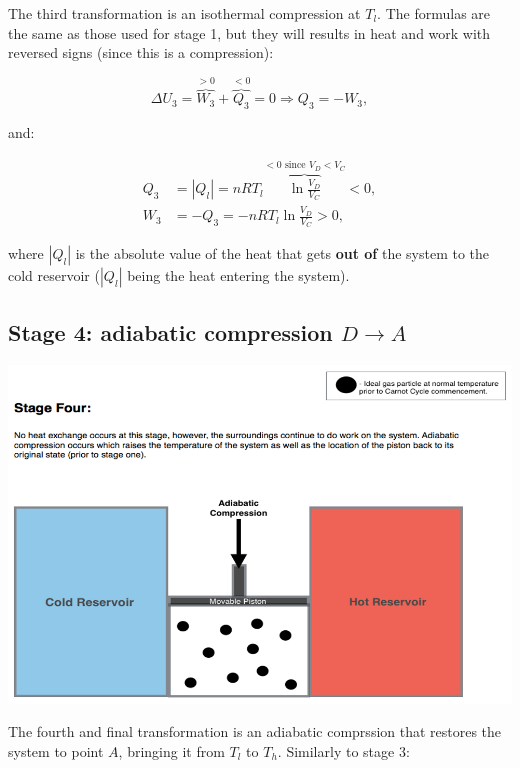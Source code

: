 \documentclass[
  9pt,
]{extbook}
\theoremstyle{definition}
\theoremstyle{definition}
\theoremstyle{definition}
\theoremstyle{definition}
\theoremstyle{remark}
\begin{document}
The third transformation is an isothermal compression at \(T_l\). The formulas are the same as those used for stage 1, but they will results in heat and work with reversed signs (since this is a compression):

\begin{equation}
\Delta U_3 = \overbrace{W_3}^{>0} + \overbrace{Q_3}^{<0} = 0 \Rightarrow Q_3 = -W_3,
  \label{eq:CCst3}
\end{equation}

and:

\begin{equation}
\begin{aligned}
 Q_3 & = \left| Q_l \right|  = nRT_l \overbrace{\ln \frac{V_D}{V_C}}^{<0 \text{ since } V_D<V_C} < 0 , \\
 W_3 & = -Q_3 = - nRT_l \ln \frac{V_D}{V_C} > 0,
\end{aligned}
  \label{eq:CCst3b}
\end{equation}

where \(\left| Q_l \right|\) is the absolute value of the heat that gets \textbf{out of} the system to the cold reservoir (\(\left| Q_l \right|\) being the heat entering the system).

\subsection{\texorpdfstring{Stage 4: adiabatic compression \(D \rightarrow A\)}{Stage 4: adiabatic compression D \textbackslash rightarrow A}}\label{CCstage4}

\begin{center}\includegraphics[width=0.7\linewidth]{./img/OEP_Figures.007d} \end{center}

The fourth and final transformation is an adiabatic comprssion that restores the system to point \(A\), bringing it from \(T_l\) to \(T_h\). Similarly to stage 3:
\end{document}
